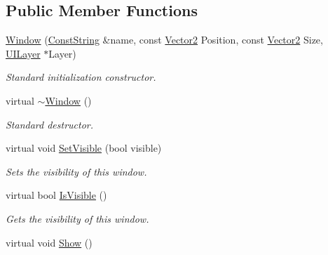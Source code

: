 \subsection*{Public Member Functions}
\begin{DoxyCompactItemize}
\item 
\hyperlink{classphys_1_1UI_1_1Window_aefaaf53a19b0b298e0a5c96d505d7355}{Window} (\hyperlink{namespacephys_a5ce5049f8b4bf88d6413c47b504ebb31}{ConstString} \&name, const \hyperlink{classphys_1_1Vector2}{Vector2} Position, const \hyperlink{classphys_1_1Vector2}{Vector2} Size, \hyperlink{classphys_1_1UILayer}{UILayer} $\ast$Layer)
\begin{DoxyCompactList}\small\item\em Standard initialization constructor. \item\end{DoxyCompactList}\item 
\hypertarget{classphys_1_1UI_1_1Window_a3480249de9950a3993c5e7f836aa8f59}{
virtual \hyperlink{classphys_1_1UI_1_1Window_a3480249de9950a3993c5e7f836aa8f59}{$\sim$Window} ()}
\label{d4/d86/classphys_1_1UI_1_1Window_a3480249de9950a3993c5e7f836aa8f59}

\begin{DoxyCompactList}\small\item\em Standard destructor. \item\end{DoxyCompactList}\item 
virtual void \hyperlink{classphys_1_1UI_1_1Window_a351439e78013bc87ecadcc00bce08573}{SetVisible} (bool visible)
\begin{DoxyCompactList}\small\item\em Sets the visibility of this window. \item\end{DoxyCompactList}\item 
virtual bool \hyperlink{classphys_1_1UI_1_1Window_aa1d88c50c0965510b494b51f3e5a7bf0}{IsVisible} ()
\begin{DoxyCompactList}\small\item\em Gets the visibility of this window. \item\end{DoxyCompactList}\item 
\hypertarget{classphys_1_1UI_1_1Window_af945bd84876d577d1dc6e1c7e28329a8}{
virtual void \hyperlink{classphys_1_1UI_1_1Window_af945bd84876d577d1dc6e1c7e28329a8}{Show} ()}
\label{d4/d86/classphys_1_1UI_1_1Window_af945bd84876d577d1dc6e1c7e28329a8}


\end{DoxyCompactItemize}
